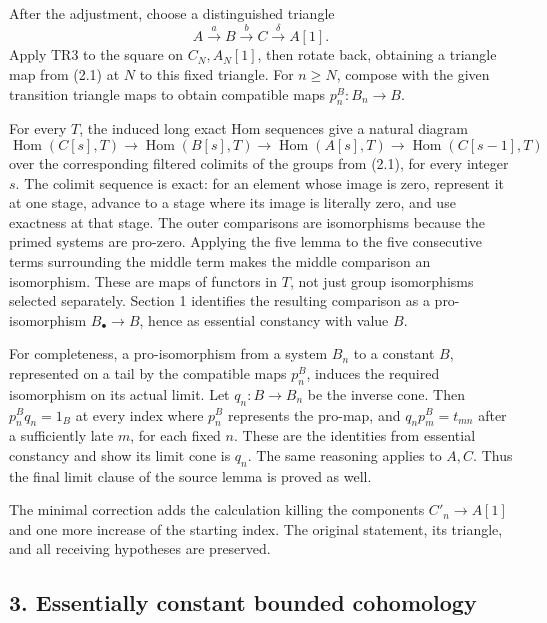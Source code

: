 After the adjustment,\allowbreak{} choose a distinguished triangle \[
A\xrightarrow{a}B\xrightarrow{b}C\xrightarrow{\delta}A[1].
\] Apply TR3 to the square on \(C_N,A_N[1]\),\allowbreak{} then rotate back,\allowbreak{} obtaining a triangle map from (2.1)\allowbreak{} at \(N\) to this fixed triangle. For \(n\geq N\),\allowbreak{} compose with the given transition triangle maps to obtain compatible maps \(p^B_n:B_n\to B\).

For every \(T\),\allowbreak{} the induced long exact Hom sequences give a natural diagram \[
\operatorname{Hom}(C[s],T)\to\operatorname{Hom}(B[s],T)
 \to\operatorname{Hom}(A[s],T)\to\operatorname{Hom}(C[s-1],T)
\] over the corresponding filtered colimits of the groups from (2.1)\allowbreak{},\allowbreak{} for every integer \(s\). The colimit sequence is exact:\allowbreak{} for an element whose image is zero,\allowbreak{} represent it at one stage,\allowbreak{} advance to a stage where its image is literally zero,\allowbreak{} and use exactness at that stage. The outer comparisons are isomorphisms because the primed systems are pro-zero. Applying the five lemma to the five consecutive terms surrounding the middle term makes the middle comparison an isomorphism. These are maps of functors in \(T\),\allowbreak{} not just group isomorphisms selected separately. Section 1 identifies the resulting comparison as a pro-isomorphism \(B_\bullet\to B\),\allowbreak{} hence as essential constancy with value \(B\).

For completeness,\allowbreak{} a pro-isomorphism from a system \(B_n\) to a constant \(B\),\allowbreak{} represented on a tail by the compatible maps \(p^B_n\),\allowbreak{} induces the required isomorphism on its actual limit. Let \(q_n:B\to B_n\) be the inverse cone. Then \(p^B_nq_n=1_B\) at every index where \(p^B_n\) represents the pro-map,\allowbreak{} and \(q_n p^B_m=t_{mn}\) after a sufficiently late \(m\),\allowbreak{} for each fixed \(n\). These are the identities from essential constancy and show its limit cone is \(q_n\). The same reasoning applies to \(A,C\). Thus the final limit clause of the source lemma is proved as well.

The minimal correction adds the calculation killing the components \(C'_n\to A[1]\) and one more increase of the starting index. The original statement,\allowbreak{} its triangle,\allowbreak{} and all receiving hypotheses are preserved.

\subsection{3. Essentially constant bounded cohomology}\label{proofs-12380-12604-essentially-constant-bounded-cohomology}

